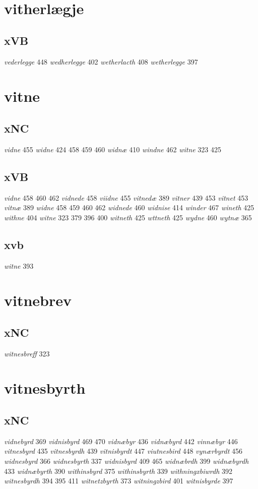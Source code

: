 \documentclass[a4paper,twocolumn]{article}
\begin{document}
\section{vitherlægje}
\label{sec:org827bb81}
\subsection{xVB}
\label{sec:orgf76d347}
\emph{vederlegge} 448 \emph{wedherlegge} 402 \emph{wetherlacth} 408 \emph{wetherlegge} 397 
\section{vitne}
\label{sec:org5a0fdc4}
\subsection{xNC}
\label{sec:org1352860}
\emph{vidne} 455 \emph{widne} 424 458 459 460 \emph{widnæ} 410 \emph{windne} 462 \emph{witne} 323 425 
\subsection{xVB}
\label{sec:org91be479}
\emph{vidne} 458 460 462 \emph{vidnede} 458 \emph{viidne} 455 \emph{vitnedæ} 389 \emph{vitner} 439 453 \emph{vitnet} 453 \emph{vitnæ} 389 \emph{widne} 458 459 460 462 \emph{widnede} 460 \emph{widnise} 414 \emph{winder} 467 \emph{wineth} 425 \emph{withne} 404 \emph{witne} 323 379 396 400 \emph{witneth} 425 \emph{wttneth} 425 \emph{wydne} 460 \emph{wytnæ} 365 
\subsection{xvb}
\label{sec:org93ad033}
\emph{witne} 393 
\section{vitnebrev}
\label{sec:orgd04e155}
\subsection{xNC}
\label{sec:org7c41b96}
\emph{witnesbreff} 323 
\section{vitnesbyrth}
\label{sec:org83f664e}
\subsection{xNC}
\label{sec:orgbdde552}
\emph{vidnebyrd} 369 \emph{vidnisbyrd} 469 470 \emph{vidnæbyr} 436 \emph{vidnæbyrd} 442 \emph{vinnæbyr} 446 \emph{vitnesbyrd} 435 \emph{vitnesbyrdh} 439 \emph{vitnisbyrdt} 447 \emph{viutnesbird} 448 \emph{vynærbyrdt} 456 \emph{widnesbyrd} 366 \emph{widnesbyrth} 337 \emph{widnisbyrd} 409 465 \emph{widnæbrdh} 399 \emph{widnæbyrdh} 433 \emph{widnæbyrth} 390 \emph{withinsbyrd} 375 \emph{withinsbyrth} 339 \emph{withningxbiwrdh} 392 \emph{witnesbyrdh} 394 395 411 \emph{witnetzbyrth} 373 \emph{witningzbird} 401 \emph{witnisbyrde} 397 
\end{document}
